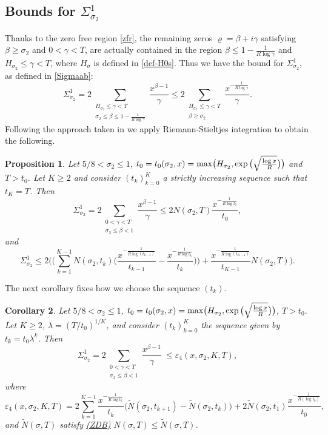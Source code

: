 \documentclass[10pt]{amsart}
\newcommand{\s}{\sigma}
\newtheorem{prop}{Proposition}[section]
\newtheorem{cor}[prop]{Corollary}
\theoremstyle{definition}
\numberwithin{equation}{section}
\begin{document}
\subsection{Bounds for $\Sigma_{\sigma_2}^{1}$}
%
Thanks to the zero free region \eqref{zfr}, the remaining zeros $\varrho=\beta+i\gamma$ satisfying $ \beta \ge \s_2$ and $0< \gamma <T$, are actually contained in the region 
$ \beta \le 1-\frac1{R\log \gamma} $ and $H_{\sigma_2} \le \gamma <T$, 
where $H_{\sigma}$ is defined in \eqref{def-H0s}.
Thus we have the bound for $\Sigma_{\s_2}^{1}$, as defined in \eqref{Sigmaab}:
\begin{equation}\label{Sigma2-1}
\Sigma_{\s_2}^{1} %
= 2 \sum_{\substack{ H_{\sigma_2}\le  \gamma <T \\  \s_2 \le \beta \le 1-\frac1{R\log \gamma}}} \frac{x^{\beta-1}}{\gamma}
\le  2 \sum_{\substack{ H_{\sigma_2}\le  \gamma <T \\  \beta \ge \s_2  }} \frac{x^{-\frac1{R\log \gamma}}}{\gamma}.
\end{equation}
Following the approach taken in \cite[Section 3]{PlaTru21ET} we apply Riemann-Stieltjes integration to obtain the following.
%
\begin{prop}\label{prop:eps4bound}
Let $ 5/8  < \s_2 \le  1$,  $t_0 =t_0(\s_2,x)= {\rm max} \big( H_{\sigma_2}, \exp\big( \sqrt{\frac{ \log x}R} \big) \big)$ and $T> t_0$.
Let $K \geq 2$ and consider $(t_k)_{k=0}^{K}$ a strictly increasing sequence such that $t_K = T$. 
 Then
\[
\Sigma_{\sigma_2}^{1}  = 2\sum_{\substack{0<\gamma<T \\ \sigma_2 \le \beta <  1}} \frac{x^{\beta-1}}{\gamma} \le   2 N(\sigma_2,T)  \frac{x^{-\frac{1}{R\log t_0 }}}{t_0} ,
\]
and 
\[
\Sigma_{\s_2}^{1}
\le  2 \Bigg( \Big( \sum_{k = 1}^{K-1} {N}(\s_2, t_k)\Big(  \frac{x^{-\frac{1}{R\log(t_{k-1})}}}{t_{k-1}} - \frac{x^{-\frac{1}{R\log t_{k} }}}{t_k} \Big)\Big)+ \frac{x^{-\frac{1}{R\log(t_{K-1})}}}{t_{K-1}}{N}(\s_2, T) \Bigg). 
\]
\end{prop}
%
The next corollary fixes how we choose the sequence $(t_k)$.
\begin{cor}\label{Cor-bnd-eps4}
Let $ 5/8  < \s_2 \le  1$,  $t_0 =t_0(\s_2,x)= {\rm max} \big( H_{\sigma_2}, \exp\big( \sqrt{\frac{ \log x}R} \big) \big)$, $T> t_0$.
Let $K \geq 2$, $\lambda = (T/t_0)^{1/K}$, and consider $(t_k)_{k=0}^{K}$ the sequence given by $t_k = t_0\lambda^k$.
Then 
\[
\Sigma_{\s_2}^{1} = 2\sum_{\substack{0<\gamma<T \\ \sigma_2 \le \beta <  1}} \frac{x^{\beta-1}}{\gamma} \
\le  \varepsilon_4(x,\s_2,K,T) ,
\]
where  
\begin{equation}\label{def-epsilon4} 
\varepsilon_4(x,\s_2,K,T)  = 2 \sum_{k=1}^{K-1}  \frac{x^{-\frac{1}{R\log t_{k} }}}{t_k} \Big(  \tilde{N}(\s_2, t_{k+1}) - \tilde{N}(\s_2, t_{k}) \Big)  + 2  \tilde{N}(\s_2, t_{1})\frac{x^{-\frac{1}{R(\log t_{0})}}}{t_0}  ,
\end{equation}
and $\tilde{N}(\sigma,T)$ satisfy \hyperref[ZDB]{(ZDB)} $N(\sigma,T)\le \tilde{N}(\sigma,T)$. 
\end{cor}
\end{document}
